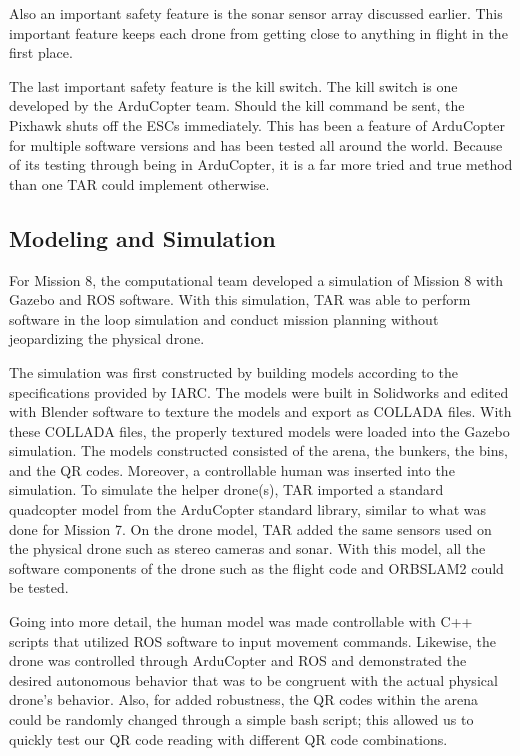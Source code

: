\documentclass[12pt,letterpaper]{article}
\begin{document}
		Also an important safety feature is the sonar sensor array discussed earlier. This important feature keeps each drone from getting close to anything in flight in the first place.

		The last important safety feature is the kill switch. The kill switch is one developed by the ArduCopter team. Should the kill command be sent, the Pixhawk shuts off the ESCs immediately. This has been a feature of ArduCopter for multiple software versions and has been tested all around the world. Because of its testing through being in ArduCopter, it is a far more tried and true method than one TAR could implement otherwise.


	\subsection*{Modeling and Simulation}
	For Mission 8, the computational team developed a simulation of Mission 8 with Gazebo and ROS software. With this simulation, TAR was able to perform software in the loop simulation and conduct mission planning without jeopardizing the physical drone.

	The simulation was first constructed by building models according to the specifications provided by IARC. The models were built in Solidworks and edited with Blender software to texture the models and export as COLLADA files. With these COLLADA files, the properly textured models were loaded into the Gazebo simulation. The models constructed consisted of the arena, the bunkers, the bins, and the QR codes. Moreover, a controllable human was inserted into the simulation. To simulate the helper drone(s), TAR imported a standard quadcopter model from the ArduCopter standard library, similar to what was done for Mission 7. On the drone model, TAR added the same sensors used on the physical drone such as stereo cameras and sonar. With this model, all the software components of the drone such as the flight code and ORBSLAM2 could be tested.

	Going into more detail, the human model was made controllable with C++ scripts that utilized ROS software to input movement commands. Likewise, the drone was controlled through ArduCopter and ROS and demonstrated the desired autonomous behavior that was to be congruent with the actual physical drone’s behavior. Also, for added robustness, the QR codes within the arena could be randomly changed through a simple bash script; this allowed us to quickly test our QR code reading with different QR code combinations.
\end{document}
